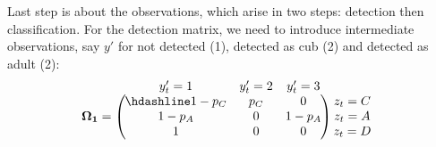\documentclass[
  12pt,
]{krantz}
\begin{document}
Last step is about the observations, which arise in two steps: detection then classification. For the detection matrix, we need to introduce intermediate observations, say \(y'\) for not detected (1), detected as cub (2) and detected as adult (2):
\[\begin{matrix}
& \\
\mathbf{\Omega_1} =
  \left ( \vphantom{ \begin{matrix} 12 \\ 12 \\ 12 \end{matrix} } \right .
          \end{matrix}
          \hspace{-1.2em}
          \begin{matrix}
          y'_t=1 & y'_t=2 & y'_t=3 \\ \hdashline
          1-p_C  & p_C & 0\\
          1-p_A & 0 & 1 - p_A\\
          1 & 0 & 0
          \end{matrix}
          \hspace{-0.2em}
          \begin{matrix}
          & \\
          \left . \vphantom{ \begin{matrix} 12 \\ 12 \\ 12 \end{matrix} } \right )
\begin{matrix}
z_{t}=C \\ z_{t}=A \\ z_{t}=D
\end{matrix}
\end{matrix}\]
\end{document}
